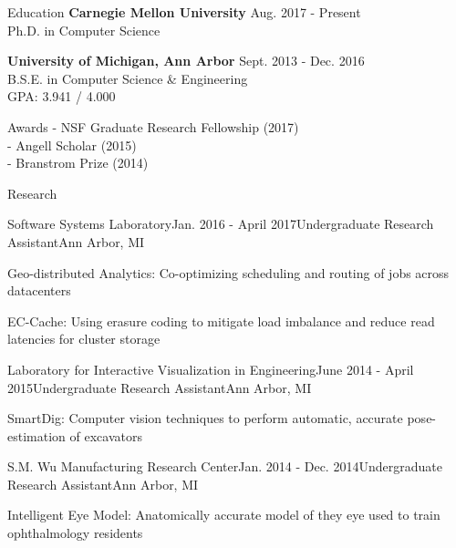 \documentclass{resume} %
\begin{document}

\begin{rSection}{Education}
{\bf Carnegie Mellon University} \hfill {Aug. 2017 - Present} \\
Ph.D. in Computer Science

{\bf University of Michigan, Ann Arbor} \hfill {Sept. 2013 - Dec. 2016} \\ 
B.S.E. in Computer Science \& Engineering \\
GPA: 3.941 / 4.000

\end{rSection}

\begin{rSection}{Awards}
- NSF Graduate Research Fellowship (2017)\\
- Angell Scholar (2015)\\
- Branstrom Prize (2014)

\end{rSection}


\begin{rSection}{Research}

\begin{rSubsection}{Software Systems Laboratory}{Jan. 2016 - April 2017}{Undergraduate Research Assistant}{Ann Arbor, MI}
\item Geo-distributed Analytics: Co-optimizing scheduling and routing of jobs across datacenters
\item EC-Cache: Using erasure coding to mitigate load imbalance and reduce read latencies for cluster storage
\end{rSubsection}

\begin{rSubsection}{Laboratory for Interactive Visualization in Engineering}{June 2014 - April 2015}{Undergraduate Research Assistant}{Ann Arbor, MI}
\item SmartDig: Computer vision techniques to perform automatic, accurate pose-estimation of excavators
\end{rSubsection}

\begin{rSubsection}{S.M. Wu Manufacturing Research Center}{Jan. 2014 - Dec. 2014}{Undergraduate Research Assistant}{Ann Arbor, MI}
\item Intelligent Eye Model: Anatomically accurate model of they eye used to train ophthalmology residents
\end{rSubsection}
\end{rSection}
\end{document}
